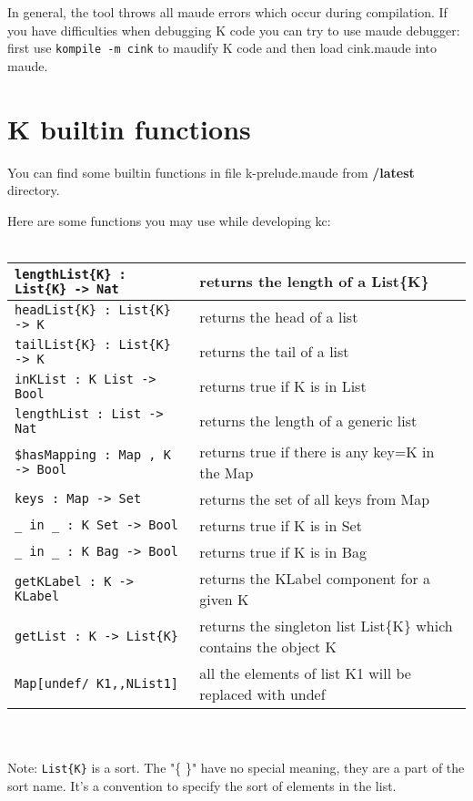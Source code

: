 \documentclass[11pt,a4paper]{article}
\begin{document}
In general, the tool throws all maude errors which occur during compilation. If you have difficulties when debugging K code you can try to use maude debugger: first use \verb^kompile -m cink^ to maudify K code and then load cink.maude into maude.

\newpage
\section{K builtin functions}

You can find some builtin functions in file k-prelude.maude from {\bf /latest} directory.

Here are some functions you may use while developing kc:
\\\\
\begin{tabular} {| l | p{5cm} | }
\hline
\texttt{lengthList\{K\} : List\{K\} -> Nat} & returns the length of a List\{K\} \\ \hline
\texttt{headList\{K\} : List\{K\} -> K} & returns the head of a list \\ \hline
\texttt{tailList\{K\} : List\{K\} -> K} & returns the tail of a list \\ \hline
\texttt{inKList : K List -> Bool} & returns true if K is in List \\ \hline
\texttt{lengthList : List -> Nat} & returns the length of a generic list \\ \hline
\texttt{\$hasMapping : Map , K -> Bool} & returns true if there is any key=K in the Map \\ \hline
\texttt{keys : Map -> Set} & returns the set of all keys from Map \\ \hline
\texttt{\_ in \_ : K Set -> Bool} & returns true if K is in Set \\ \hline
\texttt{\_ in \_ : K Bag -> Bool} & returns true if K is in Bag \\ \hline
\texttt{getKLabel : K -> KLabel} & returns the KLabel component for a given K \\ \hline
\texttt{getList : K -> List\{K\}} & returns the singleton list List\{K\} which contains the object K \\ \hline
\texttt{Map[undef/ K1,,NList1]} & all the elements of list K1 will be replaced with undef \\ \hline
\end{tabular}
\\\\
\noindent Note: \texttt{List\{K\}} is a sort. The "\{ \}" have no special meaning, they are a part of the sort name. It's a convention to specify the sort of elements in the list.
\end{document}
